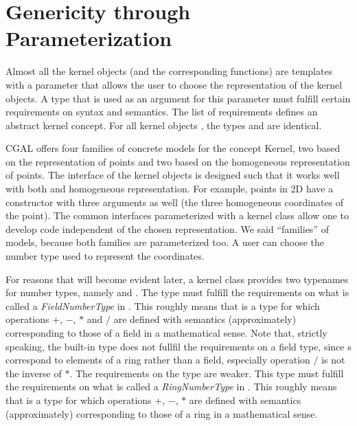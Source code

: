 \section{Genericity through Parameterization}
Almost all the kernel objects (and the corresponding functions) are
templates with a parameter that allows the user to choose the
representation of the kernel objects. A type that is used as an
argument for this parameter must fulfill certain requirements on
syntax and semantics. The list of requirements defines an abstract
kernel concept. For all kernel objects , the types
 and  are identical.

CGAL offers four families of concrete models for the concept Kernel,
two based on the  representation of
points and two based on the homogeneous representation of points. The
interface of the kernel objects is designed such that it works well
with both  and homogeneous
representation. For example, points in 2D have a constructor with
three arguments as well (the three homogeneous coordinates of the
point).  The common interfaces parameterized with a kernel class allow
one to develop code independent of the chosen representation.  We said
``families'' of models, because both families are parameterized too.
A user can choose the number type used to represent the coordinates.

For reasons that will become evident later, a kernel class provides
two typenames for number types,
namely  and .%
 The type  must fulfill the
requirements on what is called a {\em FieldNumberType} in \cgal. This
roughly means that  is a type for which operations
$+$, $-$, $*$ and $/$ are defined with semantics (approximately)
corresponding to those of a field in a mathematical sense. Note that,
strictly speaking, the built-in type  does not fullfil the
requirements on a field type, since s correspond to elements
of a ring rather than a field, especially operation $/$ is not the
inverse of $*$.  The requirements on the type  are
weaker.  This type must fulfill the requirements on what is called a
{\em RingNumberType} in \cgal. This roughly means that
 is a type for which operations $+$, $-$, $*$ are
defined with semantics (approximately) corresponding to those of a
ring in a mathematical sense. 

